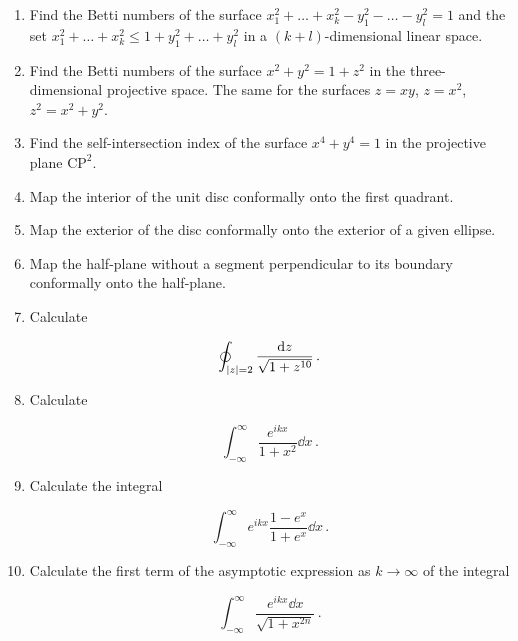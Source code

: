 \documentclass{article}
\begin{document}
\begin{enumerate}
\item Find the Betti numbers of the surface $x^2_1 + \dots + x^2_k - y^2_1 - \dots - y^2_l = 1$ and the set $x^2_1 + \dots + x^2_k \leq 1 + y^2_1 + \dots + y^2_l$ in a $(k + l)$-dimensional linear space.

\item Find the Betti numbers of the surface $x^2 + y^2 = 1 + z^2$ in the three-dimensional projective space. The same for the surfaces $z = xy$, $z = x^2$, $z^2 = x^2 + y^2$.

\item Find the self-intersection index of the surface $x^4 + y^4 = 1$ in the projective plane $\textrm{CP}^2$.

\item Map the interior of the unit disc conformally onto the first quadrant.

\item Map the exterior of the disc conformally onto the exterior of a given ellipse.

\item Map the half-plane without a segment perpendicular to its boundary conformally onto the half-plane.

\item Calculate

  \begin{equation*}
    \oint_{\abs{z}=2} \frac{\dd z}{\sqrt{1+z^{10}}} \, .
  \end{equation*}

\item Calculate

  \begin{equation*}
    \int_{-\infty}^\infty \frac{e^{ikx}}{1+x^2} \dd x \, .
  \end{equation*}

\item Calculate the integral

  \begin{equation*}
    \int_{-\infty}^\infty e^{ikx} \frac{1 - e^x}{1+e^x} \dd x \, .
  \end{equation*}

\item Calculate the first term of the asymptotic expression as $k \to \infty$ of the integral

  \begin{equation*}
    \int_{-\infty}^{\infty} \frac{e^{ikx} \dd x}{\sqrt{1 + x^{2n}}} \, .
  \end{equation*}


\end{enumerate}
\end{document}
